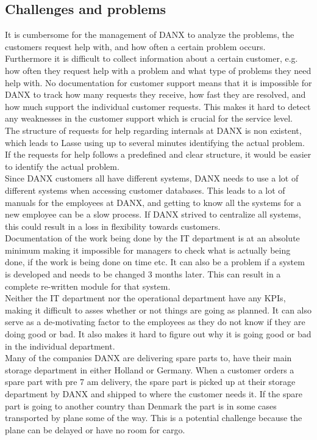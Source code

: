 \subsection{Challenges and problems}
It is cumbersome for the management of DANX to analyze the problems, the customers request help with, and how often a certain problem occurs.\cite{gert012} Furthermore it is difficult to collect information about a certain customer, e.g. how often they request help with a problem and what type of problems they need help with. No documentation for customer support means that it is impossible for DANX to track how many requests they receive, how fast they are resolved, and how much support the individual customer requests.\cite{gert011}\cite{gert012}
This makes it hard to detect any weaknesses in the customer support which is crucial for the service level. \\
The structure of requests for help regarding internals at DANX is non existent, which leads to Lasse using up to several minutes identifying the actual problem.\cite{lasse010} If the requests for help follows a predefined and clear structure, it would be easier to identify the actual problem. \\

Since DANX customers all have different systems, DANX needs to use a lot of different systems when accessing customer databases.\cite{lasse019} This leads to a lot of manuals for the employees at DANX, and getting to know all the systems for a new employee can be a slow process.\cite{opemployee001} If DANX strived to centralize all systems, this could result in a loss in flexibility towards customers. \\

Documentation of the work being done by the IT department is at an absolute minimum\cite{lasse007} making it impossible for managers to check what is actually being done, if the work is being done on time etc.
It can also be a problem if a system is developed and needs to be changed 3 months later. This can result in a complete re-written module for that system.\cite{lahib001} \\
Neither the IT department nor the operational department have any KPIs\cite{gert011}, making it difficult to asses whether or not things are going as planned. It can also serve as a de-motivating factor to the employees as they do not know if they are doing good or bad. It also makes it hard to figure out why it is going good or bad in the individual department. \\
Many of the companies DANX are delivering spare parts to, have their main storage department in either Holland\cite{gert001} or Germany\cite{gert002}. When a customer orders a spare part with pre 7 am delivery, the spare part is picked up at their storage department by DANX and shipped to where the customer needs it. If the spare part is going to another country than Denmark the part is in some cases transported by plane some of the way. This is a potential challenge because the plane can be delayed or have no room for cargo.
